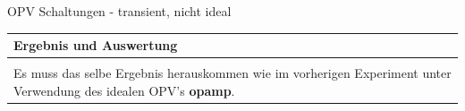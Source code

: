 \begin{frame}[t]{OPV Schaltungen - transient, nicht ideal}
\begin{spacing}{0.9}
\begin{tiny}
\begin{table}[h!]
        \end{table}
        
        \end{tiny} \end{spacing}

                    
      \begin{spacing}{0.9} \begin{tiny}
        \begin{table}[h!]
          \begin{tabular}{p{10cm} }
            \hline
            \textbf{Ergebnis und Auswertung} \\
            \hline \\    
            Es muss das selbe Ergebnis herauskommen wie im vorherigen Experiment unter Verwendung des idealen OPV's \textbf{opamp}.
          \end{tabular}
        \end{table}
      \end{tiny} \end{spacing}
        
         \end{frame}


